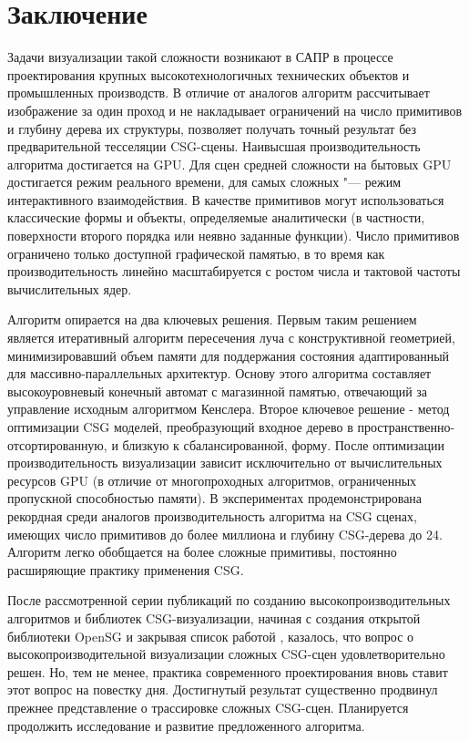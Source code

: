 \section{Заключение} \label{sect_final}

Задачи визуализации такой сложности возникают в САПР в процессе проектирования крупных высокотехнологичных технических объектов и промышленных производств. В отличие от аналогов алгоритм рассчитывает изображение за один проход и не накладывает ограничений на число примитивов и глубину дерева их структуры, позволяет получать точный результат без предварительной тесселяции CSG-сцены. Наивысшая производительность алгоритма достигается на GPU. Для сцен средней сложности на бытовых GPU достигается режим  реального времени, для самых сложных "--- режим интерактивного взаимодействия. В качестве примитивов могут использоваться классические формы и объекты, определяемые аналитически (в частности, поверхности второго порядка или неявно заданные функции). Число примитивов ограничено только доступной графической памятью, в то время как производительность линейно масштабируется с ростом числа и тактовой частоты вычислительных ядер.

Алгоритм опирается на два ключевых решения. Первым таким решением является итеративный алгоритм пересечения луча с конструктивной геометрией, минимизировавший объем памяти для поддержания состояния адаптированный для массивно-параллельных архитектур. Основу этого алгоритма составляет высокоуровневый конечный автомат с магазинной памятью, отвечающий за управление исходным алгоритмом Кенслера. Второе ключевое решение - метод оптимизации CSG моделей, преобразующий входное дерево в пространственно-отсортированную, и близкую к сбалансированной, форму. После оптимизации производительность визуализации зависит исключительно от вычислительных ресурсов GPU (в отличие от многопроходных алгоритмов, ограниченных пропускной способностью памяти). В экспериментах продемонстрирована рекордная среди аналогов производительность алгоритма на CSG сценах, имеющих число примитивов до более миллиона и глубину CSG-дерева до 24. Алгоритм легко обобщается на более сложные примитивы, постоянно расширяющие практику применения CSG.

После рассмотренной серии публикаций по созданию высокопроизводительных алгоритмов и библиотек CSG-визуализации, начиная с создания открытой библиотеки OpenSG  и закрывая список работой \todo{[7]}, казалось, что вопрос о высокопроизводительной визуализации сложных CSG-сцен удовлетворительно решен. Но, тем не менее, практика современного проектирования вновь ставит этот вопрос на повестку дня. Достигнутый результат существенно продвинул прежнее представление о трассировке сложных CSG-сцен. Планируется продолжить исследование и развитие предложенного алгоритма.
